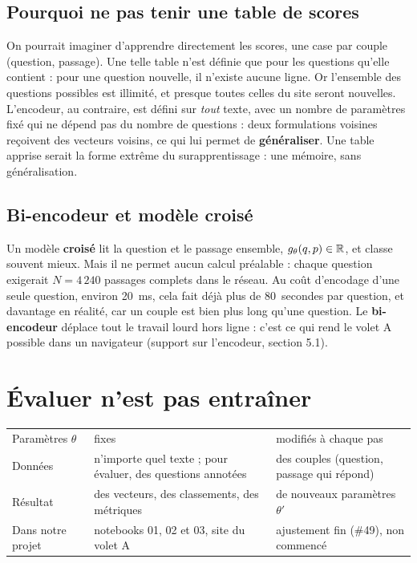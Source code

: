 \subsection{Pourquoi ne pas tenir une table de scores}

On pourrait imaginer d'apprendre directement les scores, une case par couple (question, passage). Une telle table
n'est définie que pour les questions qu'elle contient : pour une question nouvelle, il n'existe aucune ligne. Or
l'ensemble des questions possibles est illimité, et presque toutes celles du site seront nouvelles. L'encodeur, au
contraire, est défini sur \emph{tout} texte, avec un nombre de paramètres fixé qui ne dépend pas du nombre de
questions : deux formulations voisines reçoivent des vecteurs voisins, ce qui lui permet de \textbf{généraliser}. Une
table apprise serait la forme extrême du surapprentissage : une mémoire, sans généralisation.

\subsection{Bi-encodeur et modèle croisé}

Un modèle \textbf{croisé} lit la question et le passage ensemble, $g_\theta(q, p) \in \mathbb{R}$, et classe souvent mieux.
Mais il ne permet aucun calcul préalable : chaque question exigerait $N = 4\,240$ passages complets dans le
réseau. Au coût d'encodage d'une seule question, environ 20~ms, cela fait déjà plus de 80~secondes par question,
et davantage en réalité, car un couple est bien plus long qu'une question. Le \textbf{bi-encodeur} déplace tout le
travail lourd hors ligne : c'est ce qui rend le volet A possible dans un navigateur (support sur l'encodeur,
section 5.1).

\section{Évaluer n'est pas entraîner}

\begin{tabletype}
\begin{tabularx}{\textwidth}{@{}L{3.0cm}YY@{}}
\toprule
&  &  \\
\midrule
Paramètres $\theta$ & fixes & modifiés à chaque pas \\
Données & n'importe quel texte ; pour évaluer, des questions annotées & des couples (question, passage qui répond) \\
Résultat & des vecteurs, des classements, des métriques & de nouveaux paramètres $\theta'$ \\
Dans notre projet & notebooks 01, 02 et 03, site du volet A & ajustement fin (\#49), non commencé \\
\bottomrule
\end{tabularx}
\end{tabletype}

